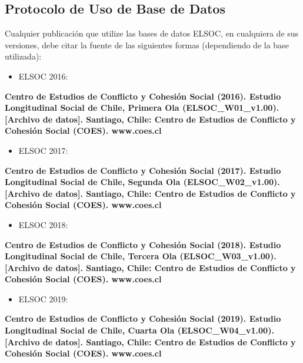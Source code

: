 \documentclass[
  12pt,
]{article}
\providecommand{\tightlist}{%
  \setlength{\itemsep}{0pt}\setlength{\parskip}{0pt}}
\begin{document}
\hypertarget{protocolo-de-uso-de-base-de-datos}{%
\subsection{Protocolo de Uso de Base de Datos}\label{protocolo-de-uso-de-base-de-datos}}

Cualquier publicación que utilize las bases de datos ELSOC, en cualquiera de sus versiones, debe citar la fuente de las siguientes formas (dependiendo de la base utilizada):

\begin{itemize}
\tightlist
\item
  ELSOC 2016:
\end{itemize}

\textbf{Centro de Estudios de Conflicto y Cohesión Social (2016). Estudio Longitudinal Social de Chile, Primera Ola (ELSOC\_W01\_v1.00). {[}Archivo de datos{]}. Santiago, Chile: Centro de Estudios de Conflicto y Cohesión Social (COES). www.coes.cl}

\begin{itemize}
\tightlist
\item
  ELSOC 2017:
\end{itemize}

\textbf{Centro de Estudios de Conflicto y Cohesión Social (2017). Estudio Longitudinal Social de Chile, Segunda Ola (ELSOC\_W02\_v1.00). {[}Archivo de datos{]}. Santiago, Chile: Centro de Estudios de Conflicto y Cohesión Social (COES). www.coes.cl}

\begin{itemize}
\tightlist
\item
  ELSOC 2018:
\end{itemize}

\textbf{Centro de Estudios de Conflicto y Cohesión Social (2018). Estudio Longitudinal Social de Chile, Tercera Ola (ELSOC\_W03\_v1.00). {[}Archivo de datos{]}. Santiago, Chile: Centro de Estudios de Conflicto y Cohesión Social (COES). www.coes.cl}

\begin{itemize}
\tightlist
\item
  ELSOC 2019:
\end{itemize}

\textbf{Centro de Estudios de Conflicto y Cohesión Social (2019). Estudio Longitudinal Social de Chile, Cuarta Ola (ELSOC\_W04\_v1.00). {[}Archivo de datos{]}. Santiago, Chile: Centro de Estudios de Conflicto y Cohesión Social (COES). www.coes.cl}
\end{document}
